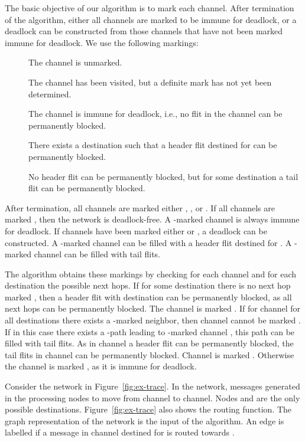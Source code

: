 \documentclass[submission,copyright]{eptcs}
\begin{document}
The basic objective of our algorithm is to mark each channel.
After termination of the algorithm, either all channels are marked to be immune for deadlock, or a deadlock can be constructed from those channels that have not been marked immune for deadlock.
We use the following markings:
\begin{description}
\item[] The channel is unmarked.
\item[] The channel has been visited, but a definite mark has not yet been determined. 
\item[] The channel is immune for deadlock, i.e., no flit in the channel can be permanently blocked.\item[] There exists a destination  such that a header flit destined for  can be permanently blocked.\item[] No header flit can be permanently blocked, but for some destination  a tail flit can be permanently blocked.\end{description}
After termination, all channels are marked either , , or . If all channels are marked , then the network is deadlock-free. A -marked channel is always immune for deadlock. If channels have been marked either  or , a deadlock can be constructed. A -marked channel  can be filled with a header flit destined for .
A -marked channel  can be filled with tail flits. 

The algorithm obtains these markings by checking for each channel  and for each destination  the possible next hops.
If for some destination  there is no next hop marked , then a header flit with destination  can be permanently blocked, as all next hops can be permanently blocked.
The channel is marked .
If for channel  for all destinations there exists a -marked neighbor, then channel  cannot be marked .
If in this case there exists a -path leading to -marked channel , this path can be filled with tail flits. As in channel  a header flit can be permanently blocked, the tail flits in channel  can be permanently blocked. Channel  is marked . Otherwise the channel is marked , as it is immune for deadlock.

Consider the network in Figure~\ref{fig:ex-trace}. In the network, messages generated in the processing nodes  to  move from channel to channel. Nodes  and  are the only possible destinations. Figure~\ref{fig:ex-trace} also shows the routing function.
The graph representation of the network is the input of the algorithm.
An edge  is labelled  if a message in channel  destined for  is routed towards .
\end{document}
